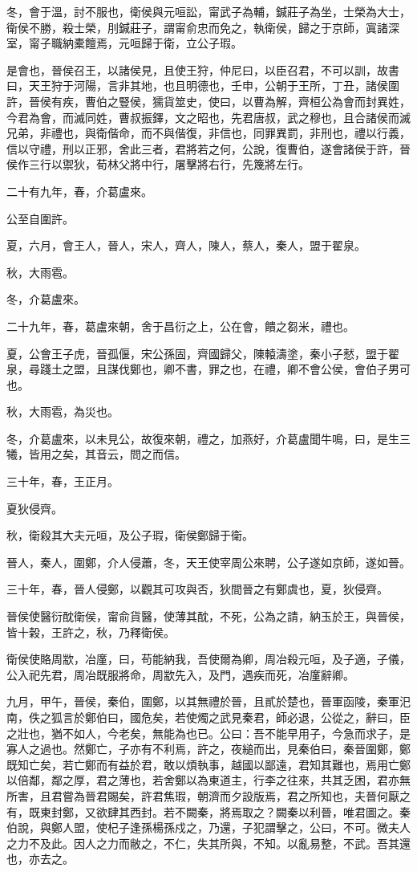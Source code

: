 \begin{pinyinscope}
冬，會于溫，討不服也，衛侯與元咺訟，甯武子為輔，鍼莊子為坐，士榮為大士，衛侯不勝，殺士榮，刖鍼莊子，謂甯俞忠而免之，執衛侯，歸之于京師，寘諸深室，甯子職納橐饘焉，元咺歸于衛，立公子瑕。

是會也，晉侯召王，以諸侯見，且使王狩，仲尼曰，以臣召君，不可以訓，故書曰，天王狩于河陽，言非其地，也且明德也，壬申，公朝于王所，丁丑，諸侯圍許，晉侯有疾，曹伯之豎侯，獳貨筮史，使曰，以曹為解，齊桓公為會而封異姓，今君為會，而滅同姓，曹叔振鐸，文之昭也，先君唐叔，武之穆也，且合諸侯而滅兄弟，非禮也，與衛偕命，而不與偕復，非信也，同罪異罰，非刑也，禮以行義，信以守禮，刑以正邪，舍此三者，君將若之何，公說，復曹伯，遂會諸侯于許，晉侯作三行以禦狄，荀林父將中行，屠擊將右行，先篾將左行。

二十有九年，春，介葛盧來。

公至自圍許。

夏，六月，會王人，晉人，宋人，齊人，陳人，蔡人，秦人，盟于翟泉。

秋，大雨雹。

冬，介葛盧來。

二十九年，春，葛盧來朝，舍于昌衍之上，公在會，饋之芻米，禮也。

夏，公會王子虎，晉孤偃，宋公孫固，齊國歸父，陳轅濤塗，秦小子憖，盟于翟泉，尋踐土之盟，且謀伐鄭也，卿不書，罪之也，在禮，卿不會公侯，會伯子男可也。

秋，大雨雹，為災也。

冬，介葛盧來，以未見公，故復來朝，禮之，加燕好，介葛盧聞牛鳴，曰，是生三犧，皆用之矣，其音云，問之而信。

三十年，春，王正月。

夏狄侵齊。

秋，衛殺其大夫元咺，及公子瑕，衛侯鄭歸于衛。

晉人，秦人，圍鄭，介人侵蕭，冬，天王使宰周公來聘，公子遂如京師，遂如晉。

三十年，春，晉人侵鄭，以觀其可攻與否，狄間晉之有鄭虞也，夏，狄侵齊。

晉侯使醫衍酖衛侯，甯俞貨醫，使薄其酖，不死，公為之請，納玉於王，與晉侯，皆十榖，王許之，秋，乃釋衛侯。

衛侯使賂周歂，冶廑，曰，苟能納我，吾使爾為卿，周冶殺元咺，及子適，子儀，公入祀先君，周冶既服將命，周歂先入，及門，遇疾而死，冶廑辭卿。

九月，甲午，晉侯，秦伯，圍鄭，以其無禮於晉，且貳於楚也，晉軍函陵，秦軍汜南，佚之狐言於鄭伯曰，國危矣，若使燭之武見秦君，師必退，公從之，辭曰，臣之壯也，猶不如人，今老矣，無能為也已。公曰：吾不能早用子，今急而求子，是寡人之過也。然鄭亡，子亦有不利焉，許之，夜縋而出，見秦伯曰，秦晉圍鄭，鄭既知亡矣，若亡鄭而有益於君，敢以煩執事，越國以鄙遠，君知其難也，焉用亡鄭以倍鄰，鄰之厚，君之薄也，若舍鄭以為東道主，行李之往來，共其乏困，君亦無所害，且君嘗為晉君賜矣，許君焦瑕，朝濟而夕設版焉，君之所知也，夫晉何厭之有，既東封鄭，又欲肆其西封。若不闕秦，將焉取之？闕秦以利晉，唯君圖之。秦伯說，與鄭人盟，使杞子逢孫楊孫戍之，乃還，子犯謂擊之，公曰，不可。微夫人之力不及此。因人之力而敝之，不仁，失其所與，不知。以亂易整，不武。吾其還也，亦去之。


\end{pinyinscope}
